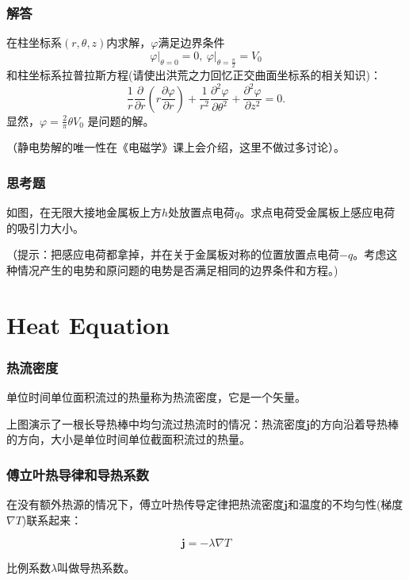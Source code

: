 \documentclass[CJK]{beamer}
\begin{document}
\begin{frame}
  \frametitle{解答}
  在柱坐标系$(r,\theta,z)$内求解，$\varphi$满足边界条件
  $$ \left.\varphi\right\vert_{\theta=0}=0,\ \left.\varphi\right\vert_{\theta=\frac{\pi}{2}}=V_0$$
  和柱坐标系拉普拉斯方程(请使出洪荒之力回忆正交曲面坐标系的相关知识)：
  $$\frac{1}{r}\frac{\partial}{\partial r}\left(r\frac{\partial\varphi}{\partial r}\right) + \frac{1}{r^2}\frac{\partial^2\varphi}{\partial\theta^2} + \frac{\partial^2\varphi}{\partial z^2} = 0.$$
  显然，$\varphi = \frac{2}{\pi}\theta V_0$ 是问题的解。

  \skiplines

  （静电势解的唯一性在《电磁学》课上会介绍，这里不做过多讨论）。
\end{frame}

\begin{frame}
  \frametitle{思考题}

  如图，在无限大接地金属板上方$h$处放置点电荷$q$。求点电荷受金属板上感应电荷的吸引力大小。

  \skiplines
  
 {\scriptsize （提示：把感应电荷都拿掉，并在关于金属板对称的位置放置点电荷$-q$。考虑这种情况产生的电势和原问题的电势是否满足相同的边界条件和方程。)}

\end{frame}

\section{Heat Equation}


\begin{frame}
  \frametitle{热流密度}
             {\blue 单位时间单位面积流过的热量称为热流密度，它是一个矢量。}



             
             上图演示了一根长导热棒中均匀流过热流时的情况：热流密度$\mathbf{j}$的方向沿着导热棒的方向，大小是单位时间单位截面积流过的热量。



\end{frame}

\begin{frame}
  \frametitle{傅立叶热导律和导热系数}
  在没有额外热源的情况下，{\blue 傅立叶热传导定律}把热流密度$\mathbf{j}$和温度的不均匀性(梯度$\nabla T$)联系起来：

  {\blue $$\mathbf{j} = -\lambda\nabla T$$}

  比例系数$\lambda$叫做{\blue 导热系数}。

\end{frame}
\end{document}
